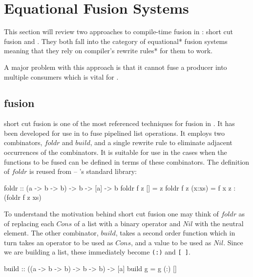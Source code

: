 \documentclass[preamble.tex]{subfiles}
\begin{document}
\chapter{Equational Fusion Systems}
\label{sec:Equational-Fusion-Systems}
\ieqfusion{}

This section will review two approaches to compile-time fusion in \Haskell:  short cut fusion and . They both fall into the category of \*equational* fusion systems meaning that they rely on compiler's \*rewrite rules* for them to work.

A major problem with this approach is that it cannot fuse a producer into multiple consumers which is vital for .


\clearpage

\section{ fusion}
\label{sec:build-foldr}

 short cut fusion \cite{GLP93} is one of the most referenced techniques for fusion in \Haskell. It has been developed for use in \GHC to fuse pipelined list operations. It employs two combinators, $foldr$ and $build$, and a single rewrite rule to eliminate adjacent occurrences of the combinators. It is suitable for use in the cases when the functions to be fused can be defined in terms of these combinators. The definition of $foldr$ is reused from  -- \Haskell's standard library:

\begin{hscode}
foldr :: (a -> b -> b) -> b -> [a] -> b
foldr f z []     = z
foldr f z (x:xs) = f x z : (foldr f z xs)
\end{hscode}


To understand the motivation behind short cut fusion one may think of $foldr$ as of replacing each $Cons$ of a list with a binary operator and $Nil$ with the neutral element. The other combinator, $build$, takes a second order function which in turn takes an operator to be used as $Cons$, and a value to be used as $Nil$. Since we are building a list, these immediately become \texttt{(:)} and \texttt{{[} {]}}.

\begin{hscode}
build :: ((a -> b -> b) -> b -> b) -> [a]
build g = g (:) []
\end{hscode}
\end{document}
